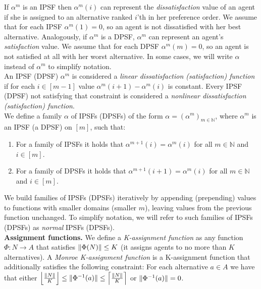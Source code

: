 If $\alpha^{m}$ is an IPSF then $\alpha^{m}(i)$ can represent the \textit{dissatisfaction} value of an agent if she is assigned to an alternative ranked $i$'th in her preference order. We assume that for each IPSF $\alpha^{m}(1) = 0$, so an agent is not dissatisfied with her best alternative. Analogously, if $\alpha^{m}$ is a DPSF, $\alpha^{m}$ can represent an agent's \textit{satisfaction} value. We assume that for each DPSF $\alpha^{m}(m) = 0$, so an agent is not satisfied at all with her worst alternative. In some cases, we will write $\alpha$ instead of $\alpha^{m}$ to simplify notation.
\\

An IPSF (DPSF) $\alpha^{m}$ is considered a \textit{linear dissatisfaction (satisfaction) function} if for each $i \in [m-1]$ value $\alpha^{m}(i+1) - \alpha^{m}(i)$ is constant. Every IPSF (DPSF) not satisfying that constraint is considered a \textit{nonlinear dissatisfaction (satisfaction) function}.
\\

We define a family $\alpha$ of IPSFs (DPSFs) of the form $\alpha = (\alpha^{m})_{m \in \mathbb{N}}$, where $\alpha^{m}$ is an IPSF (a DPSF) on $[m]$, such that:

\begin{enumerate}
	\item For a family of IPSFs it holds that $\alpha^{m+1}(i) = \alpha^{m}(i)$ for all $m \in \mathbb{N}$ and $i \in [m]$.
	\item For a family of DPSFs it holds that $\alpha^{m+1}(i+1) = \alpha^{m}(i)$ for all $m \in \mathbb{N}$ and $i \in [m]$.
\end{enumerate}

We build families of IPSFs (DPSFs) iteratively by appending (prepending) values to functions with smaller domains (smaller $m$), leaving values from the previous function unchanged. To simplify notation, we will refer to such families of IPSFs (DPSFs) as \textit{normal} IPSFs (DPSFs).
\\

\noindent
\textbf{Assignment functions.} \hspace{.1in} We define a \textit{K-assignment function} as any function $\Phi: N \rightarrow A$ that satisfies $\lVert\Phi(N)\rVert \leq K$ (it assigns agents to no more than $K$ alternatives). A \textit{Monroe K-assignment function} is a K-assignment function that additionally satisfies the following constraint: For each alternative $a \in A$ we have that either $\left\lfloor \frac{\lVert N\rVert}{K} \right\rfloor \leq \lVert\Phi^{-1}(a)\rVert \leq \left\lceil \frac{\lVert N\rVert}{K} \right\rceil$ or $\lVert\Phi^{-1}(a)\rVert = 0$.
\\

